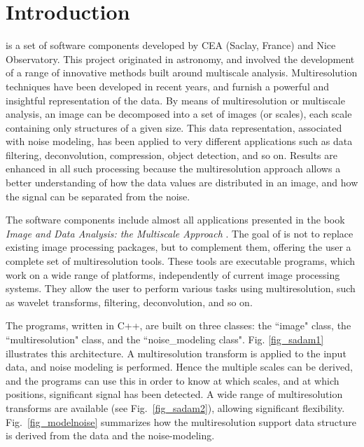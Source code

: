  
\chapter{Introduction}
\label{ch_intro}

\proj is a
set of software components 
developed by CEA (Saclay, France) and Nice Observatory. This
project originated in astronomy, and involved the development of a range of 
innovative methods built around multiscale analysis.
Multiresolution techniques have
been developed  in recent years, and furnish a powerful and 
insightful representation
of the data. By means of multiresolution or multiscale analysis, an 
image can be decomposed into a set of images (or scales), each scale 
containing only structures of a given size. 
This data representation, associated with noise modeling, 
has been applied to very different applications such as data filtering, 
deconvolution, compression, object detection, and so on. Results are 
enhanced in all such processing because the multiresolution approach
allows a better understanding of how the data values 
are distributed in an image, 
and how the signal can be separated from the noise.

The \proj software 
components include almost all applications 
presented in the book {\em Image and Data Analysis: the Multiscale Approach}
 \cite{starck:book98}. The goal of 
\proj is not to replace 
existing image processing  packages, but to complement
them, offering the user a complete set of multiresolution tools. These tools
are executable programs, which work on a wide range of platforms, 
independently of current 
image processing systems.  They allow the user to perform various tasks 
using multiresolution, such as wavelet transforms, filtering, 
deconvolution, and so on.

The programs, written in C++, are built on three classes: the  
``image" class, the ``multiresolution" class, and the 
``noise\_modeling class".
Fig. \ref{fig_sadam1} illustrates this architecture. A multiresolution
transform is applied to the input data, and noise modeling is performed.
Hence the multiple scales  can be derived, and the programs can use this
in order to know at which scales, and at which positions, significant
signal has been detected. 
A wide range of 
multiresolution transforms are available (see Fig.~\ref{fig_sadam2}),
allowing significant flexibility.
Fig.\ \ref{fig_modelnoise} summarizes how the multiresolution support data
structure 
is derived from the data and the noise-modeling. 


